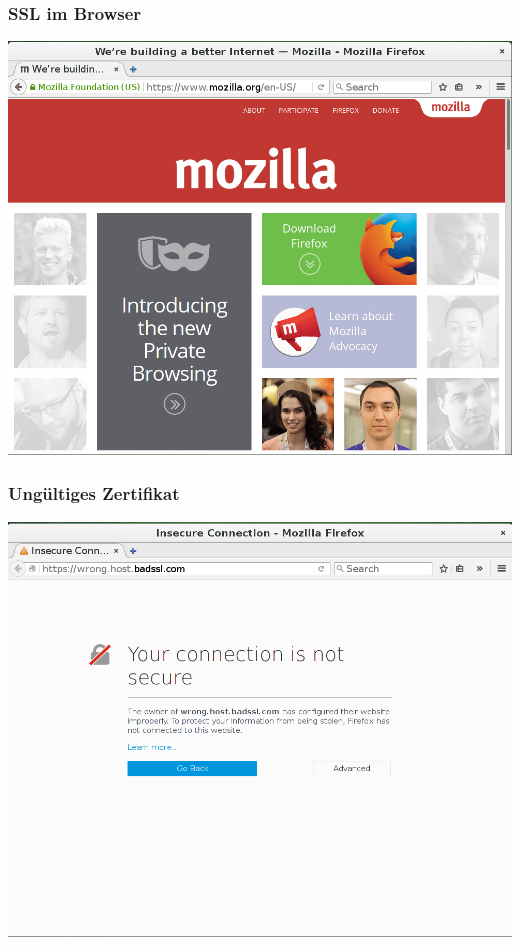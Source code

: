 \documentclass[12pt, xcolor={svgnames,table}]{beamer}
\begin{document}
\begin{frame}
    \frametitle{SSL im Browser}
    \begin{center}
	\includegraphics[height=0.7\textheight]{img/ssl_special.png}
    \end{center}
\end{frame}

\begin{frame}
    \frametitle{Ungültiges Zertifikat}
    \begin{center}
	\includegraphics[height=0.7\textheight]{img/ssl_badcert.png}
    \end{center}
\end{frame}
\end{document}
